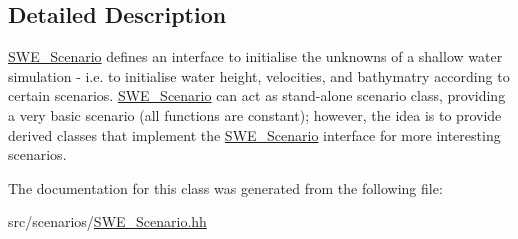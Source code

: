 \subsection{Detailed Description}
\hyperlink{classSWE__Scenario}{S\-W\-E\-\_\-\-Scenario} defines an interface to initialise the unknowns of a shallow water simulation -\/ i.\-e. to initialise water height, velocities, and bathymatry according to certain scenarios. \hyperlink{classSWE__Scenario}{S\-W\-E\-\_\-\-Scenario} can act as stand-\/alone scenario class, providing a very basic scenario (all functions are constant); however, the idea is to provide derived classes that implement the \hyperlink{classSWE__Scenario}{S\-W\-E\-\_\-\-Scenario} interface for more interesting scenarios. 

The documentation for this class was generated from the following file\-:\begin{DoxyCompactItemize}
\item 
src/scenarios/\hyperlink{SWE__Scenario_8hh}{S\-W\-E\-\_\-\-Scenario.\-hh}\end{DoxyCompactItemize}
